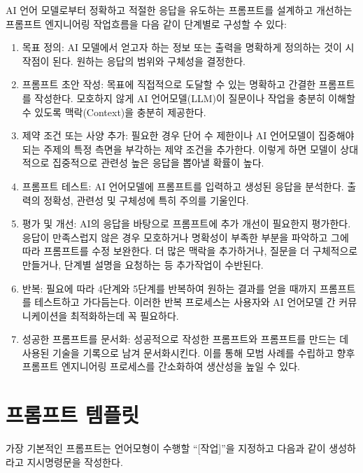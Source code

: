 \documentclass[
  letterpaper,
]{book}
\begin{document}
AI 언어 모델로부터 정확하고 적절한 응답을 유도하는 프롬프트를 설계하고
개선하는 프롬프트 엔지니어링 작업흐름을 다음 같이 단계별로 구성할 수
있다:

\begin{enumerate}
\def\labelenumi{\arabic{enumi}.}
\item
  목표 정의: AI 모델에서 얻고자 하는 정보 또는 출력을 명확하게 정의하는
  것이 시작점이 된다. 원하는 응답의 범위와 구체성을 결정한다.
\item
  프롬프트 초안 작성: 목표에 직접적으로 도달할 수 있는 명확하고 간결한
  프롬프트를 작성한다. 모호하지 않게 AI 언어모델(LLM)이 질문이나 작업을
  충분히 이해할 수 있도록 맥락(Context)을 충분히 제공한다.
\item
  제약 조건 또는 사양 추가: 필요한 경우 단어 수 제한이나 AI 언어모델이
  집중해야 되는 주제의 특정 측면을 부각하는 제약 조건을 추가한다. 이렇게
  하면 모델이 상대적으로 집중적으로 관련성 높은 응답을 뽑아낼 확률이
  높다.
\item
  프롬프트 테스트: AI 언어모델에 프롬프트를 입력하고 생성된 응답을
  분석한다. 출력의 정확성, 관련성 및 구체성에 특히 주의를 기울인다.
\item
  평가 및 개선: AI의 응답을 바탕으로 프롬프트에 추가 개선이 필요한지
  평가한다. 응답이 만족스럽지 않은 경우 모호하거나 명확성이 부족한
  부분을 파악하고 그에 따라 프롬프트를 수정 보완한다. 더 많은 맥락을
  추가하거나, 질문을 더 구체적으로 만들거나, 단계별 설명을 요청하는 등
  추가작업이 수반된다.
\item
  반복: 필요에 따라 4단계와 5단계를 반복하여 원하는 결과를 얻을 때까지
  프롬프트를 테스트하고 가다듬는다. 이러한 반복 프로세스는 사용자와 AI
  언어모델 간 커뮤니케이션을 최적화하는데 꼭 필요하다.
\item
  성공한 프롬프트를 문서화: 성공적으로 작성한 프롬프트와 프롬프트를
  만드는 데 사용된 기술을 기록으로 남겨 문서화시킨다. 이를 통해 모범
  사례를 수립하고 향후 프롬프트 엔지니어링 프로세스를 간소화하여
  생산성을 높일 수 있다.
\end{enumerate}

\hypertarget{uxd504uxb86cuxd504uxd2b8-uxd15cuxd50cuxb9bf}{%
\section{프롬프트
템플릿}\label{uxd504uxb86cuxd504uxd2b8-uxd15cuxd50cuxb9bf}}

가장 기본적인 프롬프트는 언어모형이 수행할 ``{[}작업{]}''을 지정하고
다음과 같이 생성하라고 지시명령문을 작성한다.
\end{document}
